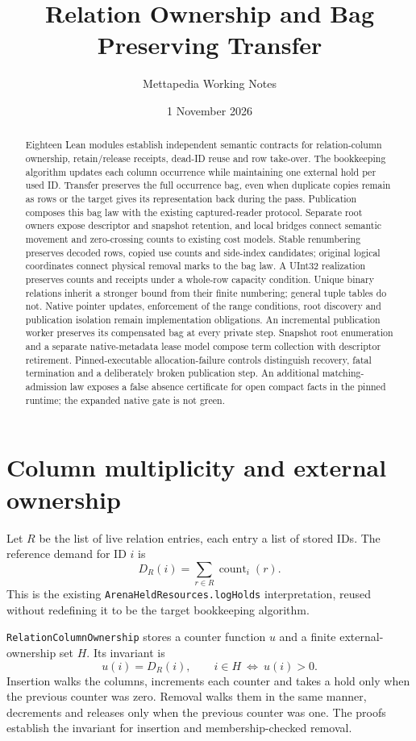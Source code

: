 \documentclass[11pt,a4paper]{article}
\title{Relation Ownership and Bag Preserving Transfer}
\author{Mettapedia Working Notes}
\date{1 November 2026}
\newcommand{\code}[1]{\nolinkurl{#1}}
\begin{document}
\maketitle
\begin{abstract}
Eighteen Lean modules establish independent semantic contracts for relation-column
ownership, retain/release receipts, dead-ID reuse and row take-over. The
bookkeeping algorithm updates each column occurrence while maintaining one
external hold per used ID. Transfer preserves the full occurrence bag, even
when duplicate copies remain as rows or the target gives its representation
back during the pass. Publication composes this bag law with the existing
captured-reader protocol. Separate root owners expose descriptor and snapshot
retention, and local bridges connect semantic movement and zero-crossing
counts to existing cost models. Stable renumbering preserves decoded rows,
copied use counts and side-index candidates; original logical coordinates
connect physical removal marks to the bag law. A UInt32 realization preserves
counts and receipts under a whole-row capacity condition. Unique binary
relations inherit a stronger bound from their finite numbering; general tuple
tables do not. Native pointer updates, enforcement of the range conditions,
root discovery and publication isolation remain implementation obligations.
An incremental publication worker preserves its compensated bag at every
private step. Snapshot root enumeration and a separate native-metadata lease
model compose term collection with descriptor retirement. Pinned-executable
allocation-failure controls distinguish recovery, fatal termination and a
deliberately broken publication step. An additional matching-admission law
exposes a false absence certificate for open compact facts in the pinned
runtime; the expanded native gate is not green.
\end{abstract}

\section{Column multiplicity and external ownership}

Let $R$ be the list of live relation entries, each entry a list of stored IDs.
The reference demand for ID $i$ is
\[
 D_R(i)=\sum_{r\in R}\operatorname{count}_i(r).
\]
This is the existing \code{ArenaHeldResources.logHolds} interpretation, reused
without redefining it to be the target bookkeeping algorithm.

\code{RelationColumnOwnership} stores a counter function $u$ and a finite
external-ownership set $H$. Its invariant is
\[
 u(i)=D_R(i),\qquad i\in H\ \Longleftrightarrow\ u(i)>0.
\]
Insertion walks the columns, increments each counter and takes a hold only
when the previous counter was zero. Removal walks them in the same manner,
decrements and releases only when the previous counter was one. The proofs
establish the invariant for insertion and membership-checked removal.
\end{document}
